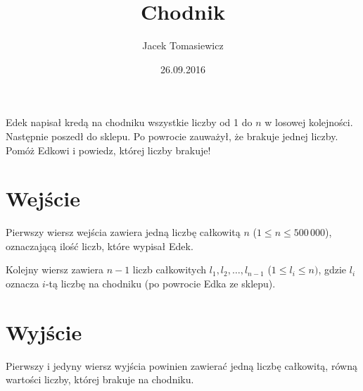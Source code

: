 \documentclass[zad,zawodnik,utf8]{sinol}
\title{Chodnik}
\author{Jacek Tomasiewicz}
\date{26.09.2016}
\begin{document}
  \begin{tasktext}%
Edek napisał kredą na chodniku wszystkie liczby od 1 do $n$ w losowej kolejności. Następnie poszedł do sklepu. Po powrocie zauważył, że brakuje jednej liczby. Pomóż Edkowi i powiedz, której liczby brakuje!

  \section{Wejście}
Pierwszy wiersz wejścia zawiera jedną liczbę całkowitą $n$ ($1 \leq n \leq 500\,000$), oznaczającą ilość liczb, które wypisał Edek.

Kolejny wiersz zawiera $n-1$ liczb całkowitych $l_1, l_2, \ldots, l_{n-1}$ ($1 \leq l_i \leq n)$, gdzie $l_i$ oznacza $i$-tą liczbę na chodniku (po powrocie Edka ze sklepu).

  \section{Wyjście}
Pierwszy i jedyny wiersz wyjścia powinien zawierać jedną liczbę całkowitą, równą wartości liczby, której brakuje na chodniku.

     \makecompactexample


  \end{tasktext}
\end{document}
